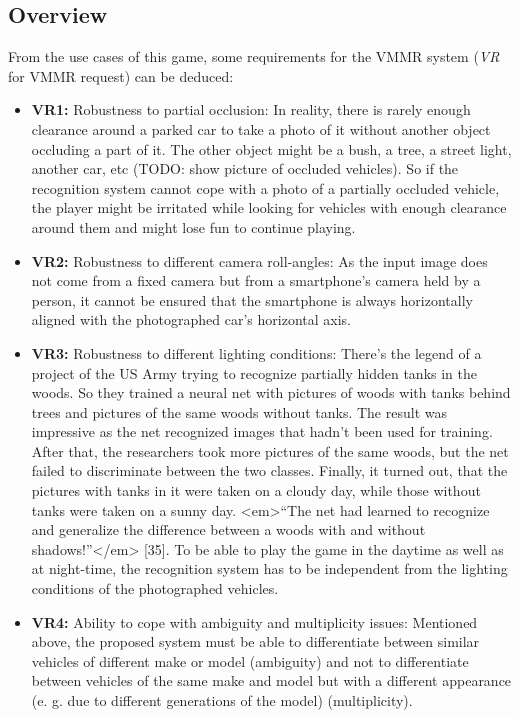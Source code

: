 \subsection{Overview}
From the use cases of this game, some requirements for the VMMR system (\emph{VR} for VMMR request) can be deduced:
\begin{itemize}
  \item\textbf{VR1:} Robustness to partial occlusion: In reality, there is rarely enough clearance around a parked car to take a photo of it without another object occluding a part of it. The other object might be a bush, a tree, a street light, another car, etc (TODO: show picture of occluded vehicles). So if the recognition system cannot cope with a photo of a partially occluded vehicle, the player might be irritated while looking for vehicles with enough clearance around them and might lose fun to continue playing.
  \item\textbf{VR2:} Robustness to different camera roll-angles: As the input image does not come from a fixed camera but from a smartphone’s camera held by a person, it cannot be ensured that the smartphone is always horizontally aligned with the photographed car’s horizontal axis.
  \item\textbf{VR3:} Robustness to different lighting conditions: There's the legend of a project of the US Army trying to recognize partially hidden tanks in the woods. So they trained a neural net with pictures of woods with tanks behind trees and pictures of the same woods without tanks. The result was impressive as the net recognized images that hadn't been used for training. After that, the researchers took more pictures of the same woods, but the net failed to discriminate between the two classes. Finally, it turned out, that the pictures with tanks in it were taken on a cloudy day, while those without tanks were taken on a sunny day. <em>“The net had learned to recognize and generalize the difference between a woods with and without shadows!”</em> [35]. To be able to play the game in the daytime as well as at night-time, the recognition system has to be independent from the lighting conditions of the photographed vehicles.
  \item\textbf{VR4:} Ability to cope with ambiguity and multiplicity issues: Mentioned above, the proposed system must be able to differentiate between similar vehicles of different make or model (ambiguity) and not to differentiate between vehicles of the same make and model but with a different appearance (e. g. due to different generations of the model) (multiplicity).
\end{itemize}
